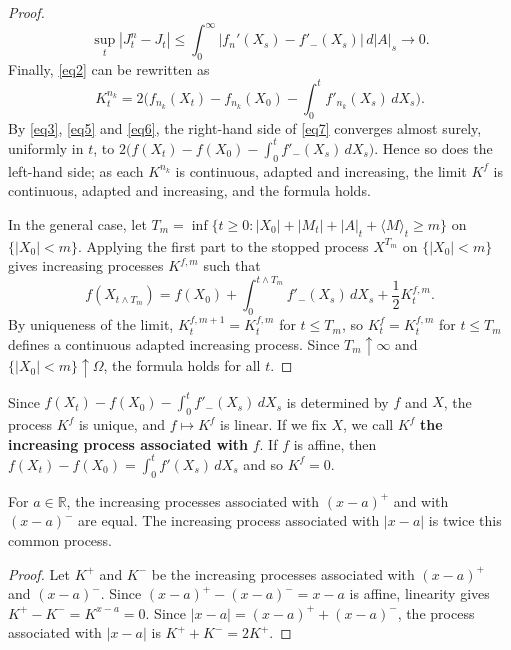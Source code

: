 \begin{proof}
\begin{equation}
		\sup_t|J_t^n-J_t| \leqslant \int_0^\infty | f_n'(X_s)- f'_-(X_s)|\,
		d|A|_s\longrightarrow 0 .
	\end{equation}
	Finally, \eqref{eq2} can be rewritten as
	\begin{equation}\label{eq7}
		K_t^{n_k} = 2\Big(f_{n_k}(X_t)-f_{n_k}(X_0)
		-\int_0^t f'_{n_k}(X_s)\,dX_s \Big) .
	\end{equation}
	By \eqref{eq3}, \eqref{eq5} and \eqref{eq6}, the right-hand side of
	\eqref{eq7} converges almost surely, uniformly in $t$, to
	$2\big(f(X_t) - f(X_0) - \int_0^t f'_-(X_s)\,dX_s\big)$. Hence so does the
	left-hand side; as each $K^{n_k}$ is continuous, adapted and increasing,
	the limit $K^f$ is continuous, adapted and increasing, and the formula
	holds.

	In the general case, let
	$T_m=\inf \{ t\geqslant 0 : |X_0| + |M_t| + |A|_t + \langle M\rangle_t
	\geqslant m \}$ on $\{|X_0| < m\}$. Applying the first part to the stopped
	process $X^{T_m}$ on $\{|X_0|<m\}$ gives increasing processes $K^{f,m}$ such
	that
	\[
		f(X_{t\wedge T_m})=f(X_0)+\int_0^{t\wedge T_m} f'_-(X_s)\, dX_s
		+\frac{1}{2} K_t^{f,m} .
	\]
	By uniqueness of the limit, $K^{f,m+1}_t = K^{f,m}_t$ for $t\leqslant T_m$,
	so $K^f_t = K^{f,m}_t$ for $t\leqslant T_m$ defines a continuous adapted
	increasing process. Since $T_m \uparrow \infty$ and
	$\{|X_0|<m\}\uparrow\Omega$, the formula holds for all $t$.
\end{proof}

Since $f(X_t) - f(X_0) - \int_0^t f'_-(X_s)\,dX_s$ is determined by $f$ and
$X$, the process $K^f$ is unique, and $f \mapsto K^f$ is linear. If we fix
$X$, we call $K^f$ \textbf{the increasing process associated with} $f$. If
$f$ is affine, then $f(X_t) - f(X_0) = \int_0^t f'(X_s)\,dX_s$ and so
$K^f = 0$.

\begin{lemma}\label{lem:pm}
	For $a\in\mathbb{R}$, the increasing processes associated with $(x-a)^+$
	and with $(x-a)^-$ are equal. The increasing process associated with
	$|x-a|$ is twice this common process.
\end{lemma}

\begin{proof}
	Let $K^+$ and $K^-$ be the increasing processes associated with
	$(x-a)^+$ and $(x-a)^-$. Since $(x-a)^+ - (x-a)^- = x-a$ is affine,
	linearity gives $K^+ - K^- = K^{x-a} = 0$. Since
	$|x-a| = (x-a)^+ + (x-a)^-$, the process associated with $|x-a|$ is
	$K^+ + K^- = 2K^+$.
\end{proof}

